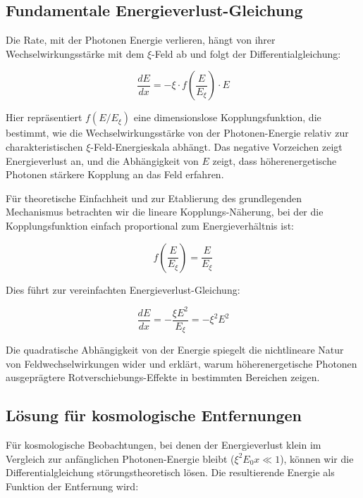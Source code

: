 \documentclass[12pt,a4paper]{article}
\begin{document}
	\subsection{Fundamentale Energieverlust-Gleichung}
	
	Die Rate, mit der Photonen Energie verlieren, hängt von ihrer Wechselwirkungsstärke mit dem $\xi$-Feld ab und folgt der Differentialgleichung:
	
	\begin{equation}
		\frac{dE}{dx} = -\xi \cdot f\left(\frac{E}{E_\xi}\right) \cdot E
	\end{equation}
	
	Hier repräsentiert $f(E/E_\xi)$ eine dimensionslose Kopplungsfunktion, die bestimmt, wie die Wechselwirkungsstärke von der Photonen-Energie relativ zur charakteristischen $\xi$-Feld-Energieskala abhängt. Das negative Vorzeichen zeigt Energieverlust an, und die Abhängigkeit von $E$ zeigt, dass höherenergetische Photonen stärkere Kopplung an das Feld erfahren.
	
	Für theoretische Einfachheit und zur Etablierung des grundlegenden Mechanismus betrachten wir die lineare Kopplungs-Näherung, bei der die Kopplungsfunktion einfach proportional zum Energieverhältnis ist:
	
	\begin{equation}
		f\left(\frac{E}{E_\xi}\right) = \frac{E}{E_\xi}
	\end{equation}
	
	Dies führt zur vereinfachten Energieverlust-Gleichung:
	
	\begin{equation}
		\frac{dE}{dx} = -\frac{\xi E^2}{E_\xi} = -\xi^2 E^2
	\end{equation}
	
	Die quadratische Abhängigkeit von der Energie spiegelt die nichtlineare Natur von Feldwechselwirkungen wider und erklärt, warum höherenergetische Photonen ausgeprägtere Rotverschiebungs-Effekte in bestimmten Bereichen zeigen.
	
	\subsection{Lösung für kosmologische Entfernungen}
	
	Für kosmologische Beobachtungen, bei denen der Energieverlust klein im Vergleich zur anfänglichen Photonen-Energie bleibt ($\xi^2 E_0 x \ll 1$), können wir die Differentialgleichung störungstheoretisch lösen. Die resultierende Energie als Funktion der Entfernung wird:
	
\end{document}
